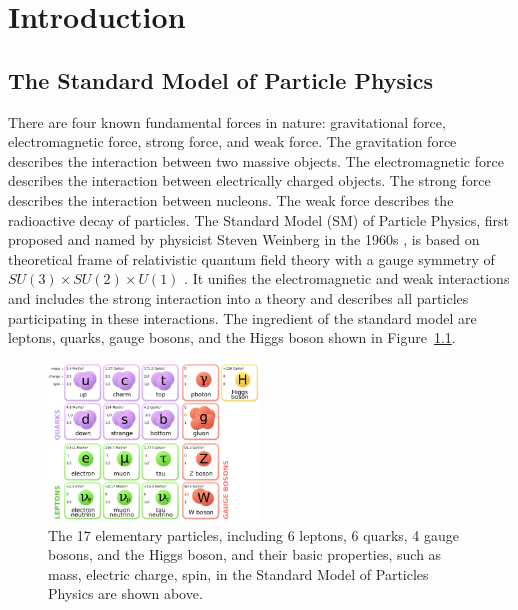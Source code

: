 
\chapter{Introduction}

\section{The Standard Model of Particle Physics}


There are four known fundamental forces in nature: gravitational force, electromagnetic force, strong force, and weak force. The gravitation force describes the interaction between two massive objects. The electromagnetic force describes the interaction between electrically charged objects. The strong force describes the interaction between nucleons. The weak force describes the radioactive decay of particles. The Standard Model (SM) of Particle Physics, first proposed and named by physicist Steven Weinberg in the 1960s \cite{StandardModel}, is based on theoretical frame of relativistic quantum field theory with a gauge symmetry of $SU(3) \times SU(2) \times U(1)$ \cite{SMTheory}. It unifies the electromagnetic and weak interactions and includes the strong interaction into a theory and describes all particles participating in these interactions. The ingredient of the standard model are leptons, quarks, gauge bosons, and the Higgs boson shown in Figure~\ref{fig:SMParticle}.

\begin{figure}[hbtp]
\begin{center}
\includegraphics[width=0.50\textwidth]{Figures/Chapter1/SMParticles.png}
\caption{The 17 elementary particles, including 6 leptons, 6 quarks, 4 gauge bosons, and the Higgs boson, and their basic properties, such as mass, electric charge, spin, in the Standard Model of Particles Physics are shown above.}
\label{fig:SMParticle}
\end{center}
\end{figure} 



